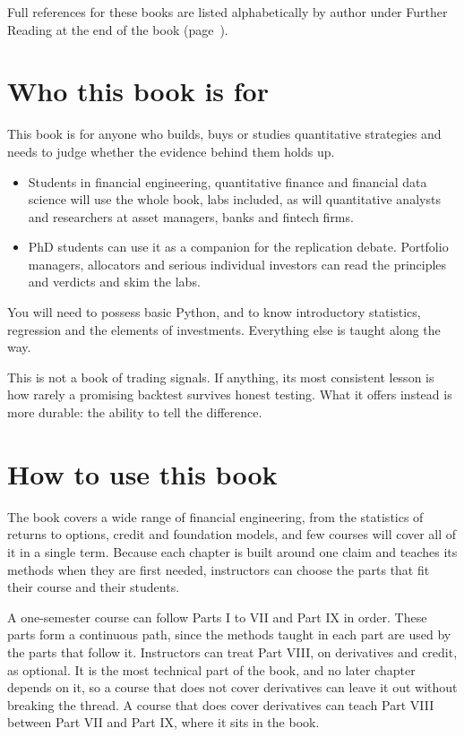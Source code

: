 Full references for these books are listed alphabetically by author under Further Reading at the end of the book (page~\pageref{furtherreading}).


\section*{Who this book is for}

This book is for anyone who builds, buys or studies quantitative strategies and needs to judge whether the evidence behind them holds up.

\begin{itemize}
  \item Students in financial engineering, quantitative finance and financial data science will use the whole book, labs included, as will quantitative analysts and researchers at asset managers, banks and fintech firms.
  \item PhD students can use it as a companion for the replication debate. Portfolio managers, allocators and serious individual investors can read the principles and verdicts and skim the labs.
\end{itemize}

You will need to possess basic Python, and to know introductory statistics, regression and the elements of investments. Everything else is taught along the way.

This is not a book of trading signals. If anything, its most consistent lesson is how rarely a promising backtest survives honest testing. What it offers instead is more durable: the ability to tell the difference.

\section*{How to use this book}

The book covers a wide range of financial engineering, from the statistics of returns to options, credit and foundation models, and few courses will cover all of it in a single term. Because each chapter is built around one claim and teaches its methods when they are first needed, instructors can choose the parts that fit their course and their students.

A one-semester course can follow Parts I to VII and Part IX in order. These parts form a continuous path, since the methods taught in each part are used by the parts that follow it. Instructors can treat Part VIII, on derivatives and credit, as optional. It is the most technical part of the book, and no later chapter depends on it, so a course that does not cover derivatives can leave it out without breaking the thread. A course that does cover derivatives can teach Part VIII between Part VII and Part IX, where it sits in the book.

